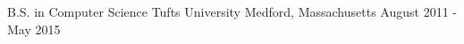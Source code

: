 \begin{cventries}
  \cventrynodescription
    {B.S. in Computer Science}
    {Tufts University}
    {Medford, Massachusetts}
    {August 2011 - May 2015}
\end{cventries}

